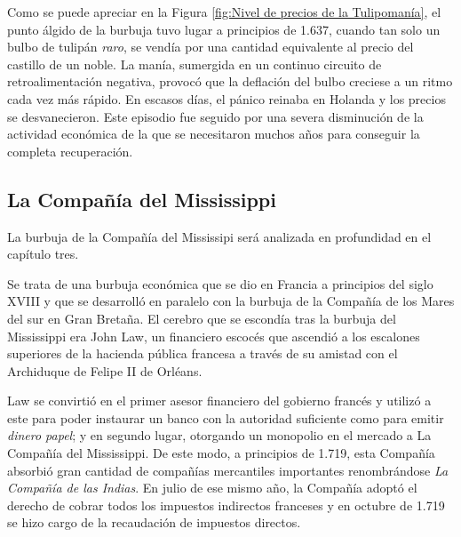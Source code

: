 Como se puede apreciar en la Figura \ref{fig:Nivel de precios de la Tulipomanía}, el punto álgido de la burbuja tuvo lugar a principios de 1.637, cuando tan solo un bulbo de tulipán \emph{raro}, se vendía por una cantidad equivalente al precio del castillo de un noble. La manía, sumergida en un continuo circuito de retroalimentación negativa, provocó que la deflación del bulbo creciese a un ritmo cada vez más rápido. En escasos días, el pánico reinaba en Holanda y los precios se desvanecieron. Este episodio fue seguido por una severa disminución de la actividad económica de la que se necesitaron muchos años para conseguir la completa recuperación.

\subsection{La Compañía del Mississippi} 

La burbuja de la Compañía del Mississipi será analizada en profundidad en el capítulo tres. 

Se trata de una burbuja económica que se dio en Francia a principios del siglo XVIII y que se desarrolló en paralelo con la burbuja de la Compañía de los Mares del sur en Gran Bretaña. El cerebro que se escondía tras la burbuja del Mississippi era John Law, un financiero escocés que ascendió a los escalones superiores de la hacienda pública francesa a través de su amistad con el Archiduque de Felipe II de Orléans.

Law se convirtió en el primer asesor financiero del gobierno francés y utilizó a este para poder instaurar un banco con la autoridad suficiente como para emitir \emph{dinero papel}; y en segundo lugar, otorgando un monopolio en el mercado a La Compañía del Mississippi. De este modo, a principios de 1.719, esta Compañía absorbió gran cantidad de compañías mercantiles importantes renombrándose \emph{La Compañía de las Indias}. En julio de ese mismo año, la Compañía adoptó el derecho de cobrar todos los impuestos indirectos franceses y en octubre de 1.719 se hizo cargo de la recaudación de impuestos directos.

